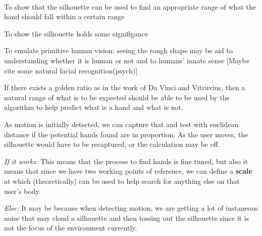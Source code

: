 \documentclass[../exps.tex]{subfiles}
\begin{document}
\pagestyle{empty}

 \\


To show that the silhouette can be used to find an appropriate range of what the hand should fall within a certain range

To show the silhouette holds some signifigance 

To emulate primitive human vision: seeing the rough shape may be aid to understanding whether it is human or not and to humans' innate sense [Maybe cite some natural facial recognition(psych)]
\\


If there exists a golden ratio as in the work of Da Vinci and Vitruvius, then a natural range of what is to be expected should be able to be used by the algorithm to help predict what is a hand and what is not. 
\\


As motion is initially detected, we can capture that and test with euclidean distance if the potential hands found are in proportion. As the user moves, the silhouette would have to be recaptured, or the calculation may be off. 
\\


\emph{If it works:} 
This means that the process to find hands is fine tuned, but also it means that since we have two working points of reference, we can define a \textbf{scale} at which (theoretically) can be used to help search for anything else on that user's body.

\emph{Else:}
It may be because when detecting motion, we are getting a lot of instaneous noise that may cloud a silhouette and then tossing out the silhouette since it is not the focus of the environment currently.
\\
\end{document}

